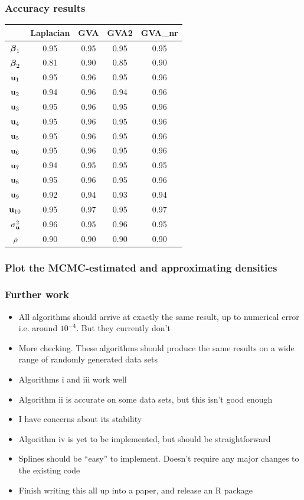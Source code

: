 \documentclass{beamer}
\begin{document}
\begin{frame}
\frametitle{Accuracy results}
\begin{tabular}{ccccc}
\hline
	& Laplacian & GVA & GVA2 & GVA\_nr \\
\hline
${\boldsymbol \beta}_1$&0.95&0.95&0.95&0.95 \\
${\boldsymbol \beta}_2$&0.81&0.90&0.85&0.90 \\
${\bf u}_1$&0.95&0.96&0.95&0.96 \\
${\bf u}_2$&0.94&0.96&0.94&0.96 \\
${\bf u}_3$&0.95&0.96&0.95&0.96 \\
${\bf u}_4$&0.95&0.96&0.95&0.96 \\
${\bf u}_5$&0.95&0.96&0.95&0.96 \\
${\bf u}_6$&0.95&0.96&0.95&0.96 \\
${\bf u}_7$&0.94&0.95&0.95&0.95 \\
${\bf u}_8$&0.95&0.96&0.95&0.96 \\
${\bf u}_9$&0.92&0.94&0.93&0.94 \\
${\bf u}_{10}$&0.95&0.97&0.95&0.97 \\
$\sigma_{\bf u}^2$&0.96&0.95&0.96&0.95 \\
$\rho$&0.90&0.90&0.90&0.90 \\
\hline
\end{tabular}
\end{frame}

\begin{frame}
\frametitle{Plot the MCMC-estimated and approximating densities}
\end{frame}

\begin{frame}
\frametitle{Further work}
\begin{itemize}
\item All algorithms should arrive at exactly the same result, up to numerical error i.e. around $10^{-4}$. But they currently don't
\item More checking. These algorithms should produce the same results on
a wide range of randomly generated data sets
\item Algorithms i and iii work well
\item Algorithm ii is accurate on some data sets, but this isn't good enough
\item I have concerns about its stability
\item Algorithm iv is yet to be implemented, but should be straightforward
\item Splines should be ``easy'' to implement. Doesn't require any major changes to the existing code
\item Finish writing this all up into a paper, and release an R package
\end{itemize}
\end{frame}
\end{document}
